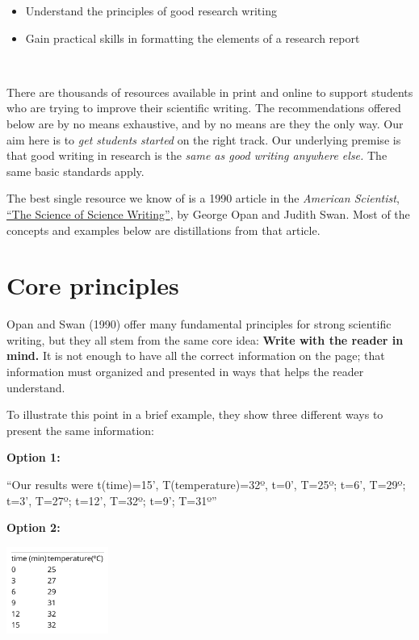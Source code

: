 \documentclass[]{book}
\providecommand{\tightlist}{%
  \setlength{\itemsep}{0pt}\setlength{\parskip}{0pt}}
\begin{document}
\begin{itemize}
\tightlist
\item
  Understand the principles of good research writing
\item
  Gain practical skills in formatting the elements of a research report
\end{itemize}

~

There are thousands of resources available in print and online to support students who are trying to improve their scientific writing. The recommendations offered below are by no means exhaustive, and by no means are they the only way. Our aim here is to \emph{get students started} on the right track. Our underlying premise is that good writing in research is the \emph{same as good writing anywhere else.} The same basic standards apply.

The best single resource we know of is a 1990 article in the \emph{American Scientist}, \href{https://www.americanscientist.org/blog/the-long-view/the-science-of-scientific-writing}{``The Science of Science Writing''}, by George Opan and Judith Swan. Most of the concepts and examples below are distillations from that article.

\hypertarget{core-principles}{%
\section*{Core principles}\label{core-principles}}

Opan and Swan (1990) offer many fundamental principles for strong scientific writing, but they all stem from the same core idea: \textbf{Write with the reader in mind.} It is not enough to have all the correct information on the page; that information must organized and presented in ways that helps the reader understand.

To illustrate this point in a brief example, they show three different ways to present the same information:

\textbf{Option 1:}

``Our results were t(time)=15', T(temperature)=32º, t=0', T=25º; t=6', T=29º; t=3', T=27º; t=12', T=32º; t=9'; T=31º''

\textbf{Option 2:}

\includegraphics[width=0.25\textwidth,height=\textheight]{img/style-eg1.png}
\end{document}
